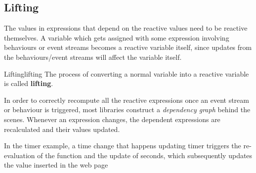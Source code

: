 \subsection{Lifting}\label{sub:rp_lifting} %
The values in expressions that depend on the reactive values need to be reactive themselves.
A variable which gets assigned with some expression involving behaviours or event streams becomes a reactive variable itself, since updates from the behaviours/event streams will affect the variable itself.
\begin{definition}{Lifting}{lifting}
    The process of converting a normal variable into a reactive variable is called \textbf{lifting}.
\end{definition}
In order to correctly recompute all the reactive expressions once an event stream or behaviour is triggered, most libraries construct a \textit{dependency graph} behind the scenes.
Whenever an expression changes, the dependent expressions are recalculated and their values updated.
\begin{note}
    In the timer example, a time change that happens updating timer triggers the re-evaluation of the function and the update of seconds, which subsequently updates the value inserted in the web page
\end{note}
%

